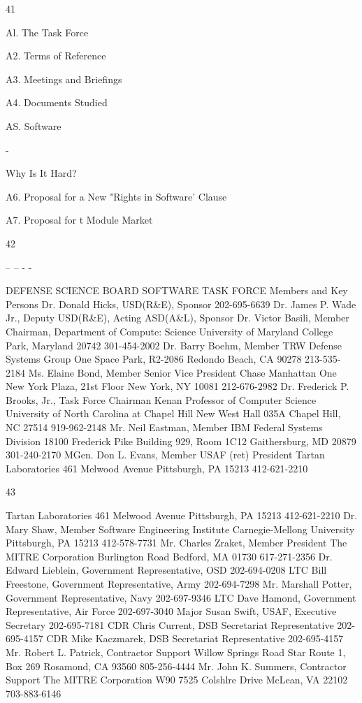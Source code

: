 \documentclass[12pt]{article}
\begin{document}
41


Al. The Task Force

A2. Terms of Reference

A3. Meetings and Briefings

A4. Documents Studied

AS. Software

-

Why Is It Hard?

A6. Proposal for a New "Rights in Software' Clause

A7. Proposal for t Module Market

42

-- -- - -

DEFENSE SCIENCE BOARD SOFTWARE TASK FORCE
Members and Key Persons
Dr. Donald Hicks, USD(R\&E), Sponsor 202-695-6639
Dr. James P. Wade Jr., Deputy USD(R\&E), Acting ASD(A\&L), Sponsor
Dr. Victor Basili, Member
Chairman, Department of Compute: Science
University of Maryland
College Park, Maryland 20742
301-454-2002
Dr. Barry Boehm, Member
TRW Defense Systems Group
One Space Park, R2-2086
Redondo Beach, CA 90278
213-535-2184
Ms. Elaine Bond, Member
Senior Vice President
Chase Manhattan
One New York Plaza, 21st Floor
New York, NY 10081
212-676-2982
Dr. Frederick P. Brooks, Jr., Task Force Chairman
Kenan Professor of Computer Science
University of North Carolina at Chapel Hill
New West Hall 035A
Chapel Hill, NC 27514
919-962-2148
Mr. Neil Eastman, Member
IBM Federal Systems Division
18100 Frederick Pike
Building 929, Room 1C12
Gaithersburg, MD 20879
301-240-2170
MGen. Don L. Evans, Member
USAF (ret)
President
Tartan Laboratories
461 Melwood Avenue
Pittsburgh, PA 15213
412-621-2210

43

Tartan Laboratories
461 Melwood Avenue
Pittsburgh, PA 15213
412-621-2210
Dr. Mary Shaw, Member
Software Engineering Institute
Carnegie-Mellong University
Pittsburgh, PA 15213
412-578-7731
Mr. Charles Zraket, Member
President
The MITRE Corporation
Burlington Road
Bedford, MA 01730
617-271-2356
Dr. Edward Lieblein, Government Representative, OSD
202-694-0208
LTC Bill Freestone, Government Representative, Army
202-694-7298
Mr. Marshall Potter, Government Representative, Navy
202-697-9346
LTC Dave Hamond, Government Representative, Air Force
202-697-3040
Major Susan Swift, USAF, Executive Secretary
202-695-7181
CDR Chris Current, DSB Secretariat Representative
202-695-4157
CDR Mike Kaczmarek, DSB Secretariat Representative
202-695-4157
Mr. Robert L. Patrick, Contractor Support
Willow Springs Road
Star Route 1, Box 269
Rosamond, CA 93560
805-256-4444
Mr. John K. Summers, Contractor Support
The MITRE Corporation W90
7525 Colshlre Drive
McLean, VA 22102
703-883-6146
\end{document}

